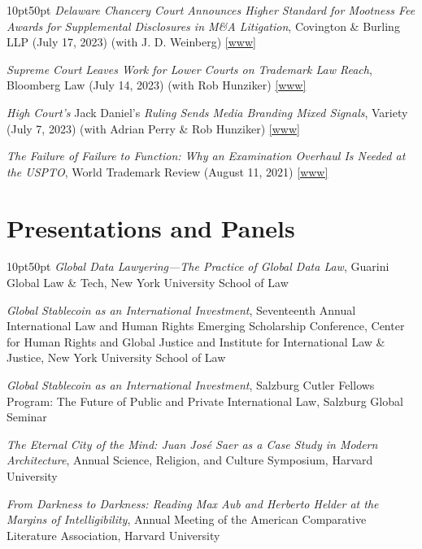 \documentclass[10pt]{article}
\newenvironment{gnoindent}
{\begin{adjustwidth}{10pt}{50pt}\setlength{\parindent}{0pt}}
{\end{adjustwidth}}
\newcommand{\years}[1]{\marginnote{\scriptsize #1}}
\begin{document}
\begin{gnoindent}
\years{2023}
\textit{Delaware Chancery Court Announces Higher Standard for Mootness Fee Awards for Supplemental Disclosures in M\&A Litigation}, Covington \& Burling LLP (July 17, 2023) (with J. D. Weinberg) \href{https://www.cov.com/en/news-and-insights/insights/2023/07/delaware-chancery-court-announces-higher-standard-for-mootness-fee-awards-for-supplemental-disclosures-in-m-and-a-litigation}{[www]} \par
\medskip
\textit{Supreme Court Leaves Work for Lower Courts on Trademark Law Reach}, Bloomberg Law (July 14, 2023) (with Rob Hunziker) \href{https://news.bloomberglaw.com/us-law-week/supreme-court-leaves-work-for-lower-courts-on-trademark-law-reach}{[www]} \par
\medskip
\textit{High Court’s} Jack Daniel's \textit{Ruling Sends Media Branding Mixed Signals}, Variety (July 7, 2023) (with Adrian Perry \& Rob Hunziker) \href{https://variety.com/vip/supreme-court-jack-daniels-ruling-sends-media-branding-mixed-signals-1235661986/}{[www]} \par
\medskip
\years{2021} \textit{The Failure of Failure to Function: Why an Examination Overhaul Is Needed at the USPTO}, World Trademark Review (August 11, 2021) \href{https://www.worldtrademarkreview.com/article/the-failure-of-failure-function-why-examination-overhaul-needed-the-uspto}{[www]}
\end{gnoindent}

\section*{Presentations and Panels}

\begin{gnoindent}
\years{2022} \textit{Global Data Lawyering—The Practice of Global Data Law}, Guarini Global Law \& Tech, New York University School of Law \par
\medskip
\years{2020} \textit{Global Stablecoin as an International Investment}, Seventeenth Annual International Law and Human Rights Emerging Scholarship Conference, Center for Human Rights and Global Justice and Institute for International Law \& Justice, New York University School of Law \par
\medskip
\years{2020} \textit{Global Stablecoin as an International Investment}, Salzburg Cutler Fellows Program: The Future of Public and Private International Law, Salzburg Global Seminar \par
\medskip
\years{2018} \textit{The Eternal City of the Mind: Juan José Saer as a Case Study in Modern Architecture}, Annual Science, Religion, and Culture Symposium, Harvard University \par
\medskip
\years{2016} \textit{From Darkness to Darkness: Reading Max Aub and Herberto Helder at the Margins of Intelligibility}, Annual Meeting of the American Comparative Literature Association, Harvard University 
\end{gnoindent}
\end{document}
